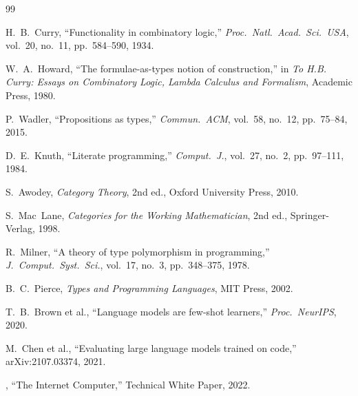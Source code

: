 \documentclass[12pt]{article}
\begin{document}
\begin{thebibliography}{99}

H.~B.~Curry,
``Functionality in combinatory logic,''
\textit{Proc.\ Natl.\ Acad.\ Sci.\ USA}, vol.~20, no.~11, pp.~584--590, 1934.

W.~A.~Howard,
``The formulae-as-types notion of construction,''
in \textit{To H.B. Curry: Essays on Combinatory Logic, Lambda Calculus and
Formalism}, Academic Press, 1980.

P.~Wadler,
``Propositions as types,''
\textit{Commun.\ ACM}, vol.~58, no.~12, pp.~75--84, 2015.

D.~E.~Knuth,
``Literate programming,''
\textit{Comput.\ J.}, vol.~27, no.~2, pp.~97--111, 1984.

S.~Awodey,
\emph{Category Theory},
2nd ed., Oxford University Press, 2010.

S.~Mac~Lane,
\emph{Categories for the Working Mathematician},
2nd ed., Springer-Verlag, 1998.

R.~Milner,
``A theory of type polymorphism in programming,''
\textit{J.\ Comput.\ Syst.\ Sci.}, vol.~17, no.~3, pp.~348--375, 1978.

B.~C.~Pierce,
\emph{Types and Programming Languages},
MIT Press, 2002.

T.~B.~Brown et al.,
``Language models are few-shot learners,''
\textit{Proc.\ NeurIPS}, 2020.

M.~Chen et al.,
``Evaluating large language models trained on code,''
arXiv:2107.03374, 2021.

,
``The Internet Computer,''
Technical White Paper, 2022.

\end{thebibliography}
\end{document}
